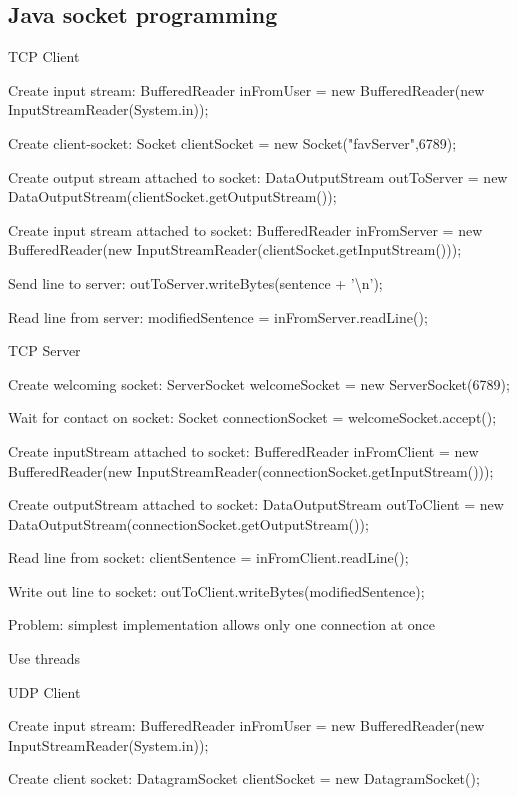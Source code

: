 \subsection{Java socket programming}
\enumstart
	\item TCP Client
	\enumstart
		\item Create input stream: BufferedReader inFromUser = new BufferedReader(new InputStreamReader(System.in));
		\item Create client-socket: Socket clientSocket = new Socket("favServer",6789);
		\item Create output stream attached to socket: DataOutputStream outToServer = new DataOutputStream(clientSocket.getOutputStream());
		\item Create input stream attached to socket: BufferedReader inFromServer = new BufferedReader(new InputStreamReader(clientSocket.getInputStream()));
		\item Send line to server: outToServer.writeBytes(sentence + '\textbackslash n');
		\item Read line from server: modifiedSentence = inFromServer.readLine();
	\enumend
	\item TCP Server
	\enumstart
		\item Create welcoming socket: ServerSocket welcomeSocket = new ServerSocket(6789);
		\item Wait for contact on socket: Socket connectionSocket = welcomeSocket.accept();
		\item Create inputStream attached to socket: BufferedReader inFromClient = new BufferedReader(new InputStreamReader(connectionSocket.getInputStream()));
		\item Create outputStream attached to socket: DataOutputStream outToClient = new DataOutputStream(connectionSocket.getOutputStream());
		\item Read line from socket: clientSentence = inFromClient.readLine();
		\item Write out line to socket: outToClient.writeBytes(modifiedSentence);
	\enumend
	\item Problem: simplest implementation allows only one connection at once
	\enumstart
		\item Use threads
	\enumend
	\item UDP Client
	\enumstart
		\item Create input stream: BufferedReader inFromUser = new BufferedReader(new InputStreamReader(System.in));
		\item Create client socket: DatagramSocket clientSocket = new DatagramSocket();

